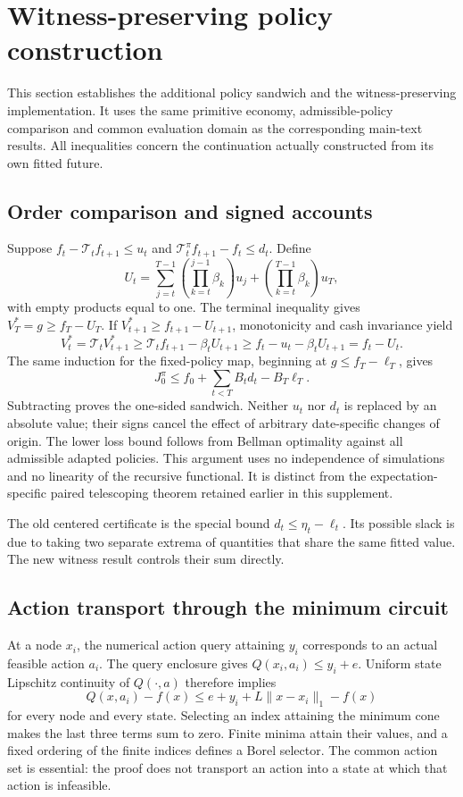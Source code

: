 \section{Witness-preserving policy construction}\label{app:witness46}
This section establishes the additional policy sandwich and the witness-preserving implementation. It uses the same primitive economy, admissible-policy comparison and common evaluation domain as the corresponding main-text results. All inequalities concern the continuation actually constructed from its own fitted future.

\subsection{Order comparison and signed accounts}
Suppose $f_t-\mathcal T_tf_{t+1}\le u_t$ and $\mathcal T_t^\pi f_{t+1}-f_t\le d_t$. Define
\[
 U_t=\sum_{j=t}^{T-1}\left(\prod_{k=t}^{j-1}\beta_k\right)u_j
       +\left(\prod_{k=t}^{T-1}\beta_k\right)u_T,
\]
with empty products equal to one. The terminal inequality gives $V_T^*=g\ge f_T-U_T$. If $V_{t+1}^*\ge f_{t+1}-U_{t+1}$, monotonicity and cash invariance yield
\[
 V_t^*=\mathcal T_tV_{t+1}^*
 \ge\mathcal T_tf_{t+1}-\beta_tU_{t+1}
 \ge f_t-u_t-\beta_tU_{t+1}=f_t-U_t.
\]
The same induction for the fixed-policy map, beginning at $g\le f_T-\ell_T$, gives
\[
 J_0^\pi\le f_0+\sum_{t<T}B_td_t-B_T\ell_T.
\]
Subtracting proves the one-sided sandwich. Neither $u_t$ nor $d_t$ is replaced by an absolute value; their signs cancel the effect of arbitrary date-specific changes of origin. The lower loss bound follows from Bellman optimality against all admissible adapted policies. This argument uses no independence of simulations and no linearity of the recursive functional. It is distinct from the expectation-specific paired telescoping theorem retained earlier in this supplement.

The old centered certificate is the special bound $d_t\le\eta_t-\ell_t$. Its possible slack is due to taking two separate extrema of quantities that share the same fitted value. The new witness result controls their sum directly.

\subsection{Action transport through the minimum circuit}
At a node $x_i$, the numerical action query attaining $y_i$ corresponds to an actual feasible action $a_i$. The query enclosure gives $Q(x_i,a_i)\le y_i+e$. Uniform state Lipschitz continuity of $Q(\cdot,a)$ therefore implies
\[
 Q(x,a_i)-f(x)\le e+y_i+L\|x-x_i\|_1-f(x)
\]
for every node and every state. Selecting an index attaining the minimum cone makes the last three terms sum to zero. Finite minima attain their values, and a fixed ordering of the finite indices defines a Borel selector. The common action set is essential: the proof does not transport an action into a state at which that action is infeasible.

